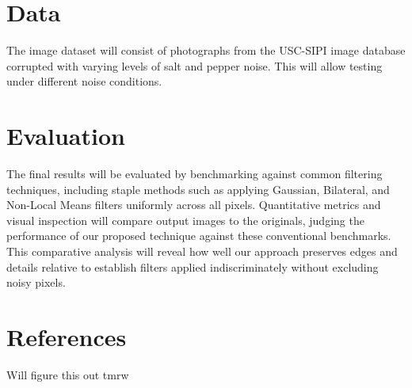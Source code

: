 \documentclass[10pt,twocolumn,letterpaper]{article}
\begin{document}
\section{Data}
The image dataset will consist of photographs from the USC-SIPI image
database corrupted with varying levels of salt and pepper noise.
This will allow testing under different noise conditions.

\section{Evaluation}
The final results will be evaluated by benchmarking against common
filtering techniques, including staple methods such as applying Gaussian,
Bilateral, and Non-Local Means filters uniformly across all pixels.
Quantitative metrics and visual inspection will compare output images to
the originals, judging the performance of our proposed technique against
these conventional benchmarks. This comparative analysis will reveal how
well our approach preserves edges and details relative to establish filters
applied indiscriminately without excluding noisy pixels.




\section{References}
Will figure this out tmrw
\end{document}
